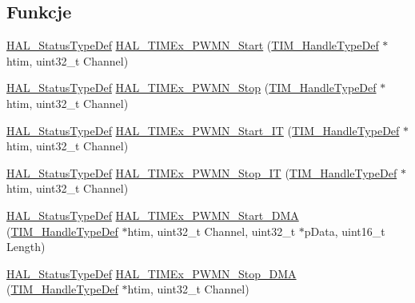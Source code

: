 \subsection*{Funkcje}
\begin{DoxyCompactItemize}
\item 
\hyperlink{stm32f4xx__hal__def_8h_a63c0679d1cb8b8c684fbb0632743478f}{H\+A\+L\+\_\+\+Status\+Type\+Def} \hyperlink{group___t_i_m_ex___exported___functions___group3_ga4f2b0bb4b66a5acd76eac4e8d32cc498}{H\+A\+L\+\_\+\+T\+I\+M\+Ex\+\_\+\+P\+W\+M\+N\+\_\+\+Start} (\hyperlink{struct_t_i_m___handle_type_def}{T\+I\+M\+\_\+\+Handle\+Type\+Def} $\ast$htim, uint32\+\_\+t Channel)
\item 
\hyperlink{stm32f4xx__hal__def_8h_a63c0679d1cb8b8c684fbb0632743478f}{H\+A\+L\+\_\+\+Status\+Type\+Def} \hyperlink{group___t_i_m_ex___exported___functions___group3_ga0f2e27f3fb6d8f42d998e2071e5f0482}{H\+A\+L\+\_\+\+T\+I\+M\+Ex\+\_\+\+P\+W\+M\+N\+\_\+\+Stop} (\hyperlink{struct_t_i_m___handle_type_def}{T\+I\+M\+\_\+\+Handle\+Type\+Def} $\ast$htim, uint32\+\_\+t Channel)
\item 
\hyperlink{stm32f4xx__hal__def_8h_a63c0679d1cb8b8c684fbb0632743478f}{H\+A\+L\+\_\+\+Status\+Type\+Def} \hyperlink{group___t_i_m_ex___exported___functions___group3_ga82f0b53f6b10e6aafc6835178662c488}{H\+A\+L\+\_\+\+T\+I\+M\+Ex\+\_\+\+P\+W\+M\+N\+\_\+\+Start\+\_\+\+IT} (\hyperlink{struct_t_i_m___handle_type_def}{T\+I\+M\+\_\+\+Handle\+Type\+Def} $\ast$htim, uint32\+\_\+t Channel)
\item 
\hyperlink{stm32f4xx__hal__def_8h_a63c0679d1cb8b8c684fbb0632743478f}{H\+A\+L\+\_\+\+Status\+Type\+Def} \hyperlink{group___t_i_m_ex___exported___functions___group3_ga13848e20df29fa552ef4f5b69fef20a6}{H\+A\+L\+\_\+\+T\+I\+M\+Ex\+\_\+\+P\+W\+M\+N\+\_\+\+Stop\+\_\+\+IT} (\hyperlink{struct_t_i_m___handle_type_def}{T\+I\+M\+\_\+\+Handle\+Type\+Def} $\ast$htim, uint32\+\_\+t Channel)
\item 
\hyperlink{stm32f4xx__hal__def_8h_a63c0679d1cb8b8c684fbb0632743478f}{H\+A\+L\+\_\+\+Status\+Type\+Def} \hyperlink{group___t_i_m_ex___exported___functions___group3_gac525533dc108ee4915ca93d5a43cb3b5}{H\+A\+L\+\_\+\+T\+I\+M\+Ex\+\_\+\+P\+W\+M\+N\+\_\+\+Start\+\_\+\+D\+MA} (\hyperlink{struct_t_i_m___handle_type_def}{T\+I\+M\+\_\+\+Handle\+Type\+Def} $\ast$htim, uint32\+\_\+t Channel, uint32\+\_\+t $\ast$p\+Data, uint16\+\_\+t Length)
\item 
\hyperlink{stm32f4xx__hal__def_8h_a63c0679d1cb8b8c684fbb0632743478f}{H\+A\+L\+\_\+\+Status\+Type\+Def} \hyperlink{group___t_i_m_ex___exported___functions___group3_ga10afdfdc5eed2e0288ccb969f48bc0e4}{H\+A\+L\+\_\+\+T\+I\+M\+Ex\+\_\+\+P\+W\+M\+N\+\_\+\+Stop\+\_\+\+D\+MA} (\hyperlink{struct_t_i_m___handle_type_def}{T\+I\+M\+\_\+\+Handle\+Type\+Def} $\ast$htim, uint32\+\_\+t Channel)
\end{DoxyCompactItemize}


